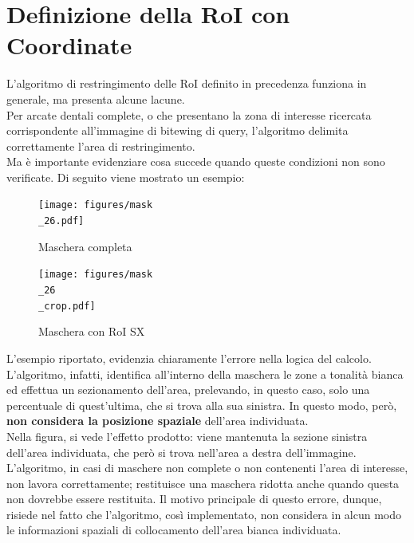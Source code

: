 \documentclass[12pt,a4paper,openright,twoside]{book}
\begin{document}
\section{Definizione della RoI con Coordinate}
L'algoritmo di restringimento delle RoI definito in precedenza funziona in generale, ma presenta alcune lacune.\\
Per arcate dentali complete, o che presentano la zona di interesse ricercata corrispondente all'immagine di bitewing di query, l'algoritmo delimita correttamente l'area di restringimento.\\
Ma è importante evidenziare cosa succede quando queste condizioni non sono verificate. Di seguito viene mostrato un esempio:
\begin{figure}[H]
    \centering
    \begin{minipage}{0.45\textwidth}
	\centering
    	\texttt{[image: figures/mask\\\_26.pdf]}
    	\caption{Maschera completa}
    	\label{lab:Maschera completa}
    \end{minipage}\hfill
    \begin{minipage}{0.45\textwidth}
    	\centering
    	\texttt{[image: figures/mask\\\_26\\\_crop.pdf]}
    	\caption{Maschera con RoI SX}
    	\label{lab:Maschera con RoI sx}
    \end{minipage}\hfill
\end{figure}
 
L'esempio riportato, evidenzia chiaramente l'errore nella logica del calcolo. L'algoritmo, infatti, identifica all'interno della maschera le zone a tonalità bianca ed effettua un sezionamento dell'area, prelevando, in questo caso, solo una percentuale di quest'ultima, che si trova alla sua sinistra. In questo modo, però, \textbf{non considera la posizione spaziale} dell'area individuata. \\
Nella figura, si vede l'effetto prodotto: viene mantenuta la sezione sinistra dell'area individuata, che però si trova nell'area a destra dell'immagine.\\
L'algoritmo, in casi di maschere non complete o non contenenti l'area di interesse, non lavora correttamente; restituisce una maschera ridotta anche quando questa non dovrebbe essere restituita. Il motivo principale di questo errore, dunque, risiede nel fatto che l'algoritmo, così implementato, non considera in alcun modo le informazioni spaziali di collocamento dell'area bianca individuata.\\
\end{document}
